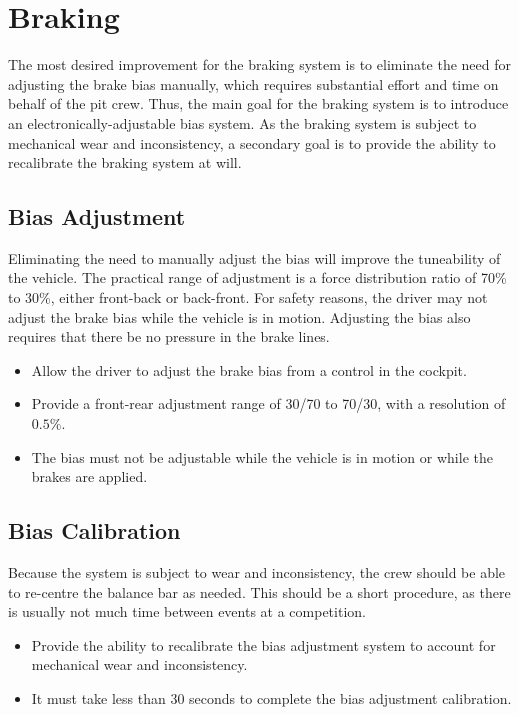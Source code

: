 \section{Braking}

The most desired improvement for the braking system is to eliminate the need for adjusting the brake bias manually, which requires substantial effort and time on behalf of the pit crew. Thus, the main goal for the braking system is to introduce an electronically-adjustable bias system. As the braking system is subject to mechanical wear and inconsistency, a secondary goal is to provide the ability to recalibrate the braking system at will.

\subsection{Bias Adjustment}

Eliminating the need to manually adjust the bias will improve the tuneability of the vehicle. The practical range of adjustment is a force distribution ratio of 70\% to 30\%, either front-back or back-front. For safety reasons, the driver may not adjust the brake bias while the vehicle is in motion. Adjusting the bias also requires that there be no pressure in the brake lines.

\begin{itemize}

\item Allow the driver to adjust the brake bias from a control in the cockpit.
\item Provide a front-rear adjustment range of 30/70 to 70/30, with a resolution of $0.5\%$.
\item The bias must not be adjustable while the vehicle is in motion or while the brakes are applied.

\end{itemize}

\subsection{Bias Calibration}

Because the system is subject to wear and inconsistency, the crew should be able to re-centre the balance bar as needed. This should be a short procedure, as there is usually not much time between events at a competition.

\begin{itemize}

\item Provide the ability to recalibrate the bias adjustment system to account for mechanical wear and inconsistency. 
\item It must take less than 30 seconds to complete the bias adjustment calibration.

\end{itemize}
